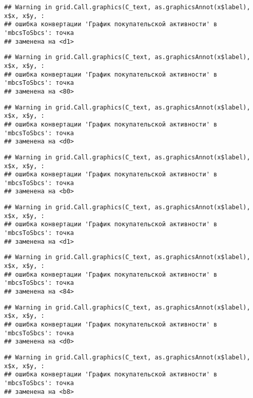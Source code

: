 \documentclass[
]{article}
\begin{document}
\begin{verbatim}
## Warning in grid.Call.graphics(C_text, as.graphicsAnnot(x$label), x$x, x$y, :
## ошибка конвертации 'График покупательской активности' в 'mbcsToSbcs': точка
## заменена на <d1>
\end{verbatim}

\begin{verbatim}
## Warning in grid.Call.graphics(C_text, as.graphicsAnnot(x$label), x$x, x$y, :
## ошибка конвертации 'График покупательской активности' в 'mbcsToSbcs': точка
## заменена на <80>
\end{verbatim}

\begin{verbatim}
## Warning in grid.Call.graphics(C_text, as.graphicsAnnot(x$label), x$x, x$y, :
## ошибка конвертации 'График покупательской активности' в 'mbcsToSbcs': точка
## заменена на <d0>
\end{verbatim}

\begin{verbatim}
## Warning in grid.Call.graphics(C_text, as.graphicsAnnot(x$label), x$x, x$y, :
## ошибка конвертации 'График покупательской активности' в 'mbcsToSbcs': точка
## заменена на <b0>
\end{verbatim}

\begin{verbatim}
## Warning in grid.Call.graphics(C_text, as.graphicsAnnot(x$label), x$x, x$y, :
## ошибка конвертации 'График покупательской активности' в 'mbcsToSbcs': точка
## заменена на <d1>
\end{verbatim}

\begin{verbatim}
## Warning in grid.Call.graphics(C_text, as.graphicsAnnot(x$label), x$x, x$y, :
## ошибка конвертации 'График покупательской активности' в 'mbcsToSbcs': точка
## заменена на <84>
\end{verbatim}

\begin{verbatim}
## Warning in grid.Call.graphics(C_text, as.graphicsAnnot(x$label), x$x, x$y, :
## ошибка конвертации 'График покупательской активности' в 'mbcsToSbcs': точка
## заменена на <d0>
\end{verbatim}

\begin{verbatim}
## Warning in grid.Call.graphics(C_text, as.graphicsAnnot(x$label), x$x, x$y, :
## ошибка конвертации 'График покупательской активности' в 'mbcsToSbcs': точка
## заменена на <b8>
\end{verbatim}
\end{document}

